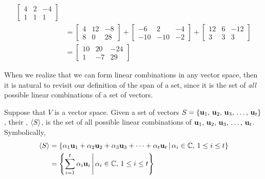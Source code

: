 \documentclass{ximera}
\begin{document}
\begin{example}
\begin{align*}
\begin{bmatrix}
                                                   4&2&-4\\
                                                   1&1&1
                                                 \end{bmatrix}\\
                                 &=
                                   \begin{bmatrix}
                                     4&12&-8\\
                                     8&0&28
                                   \end{bmatrix}
                                          +
                                          \begin{bmatrix}
                                            -6&2&-4\\
                                            -10&-10&-2
                                          \end{bmatrix}
                                                     +
                                                     \begin{bmatrix}
                                                       12&6&-12\\
                                                       3&3&3
                                                     \end{bmatrix}\\
                                 &=
                                   \begin{bmatrix}
                                     10&20&-24\\
                                     1&-7&29
                                   \end{bmatrix}
  \end{align*}
\end{example}

When we realize that we can form linear combinations in any vector
space, then it is natural to revisit our definition of the span of a
set, since it is the set of \textit{all} possible linear combinations
of a set of vectors.

\begin{definition}
  Suppose that $V$ is a vector space.
  Given a set of vectors $S=\{\mathbf{u}_{1},\,\mathbf{u}_{2},\,\mathbf{u}_{3},\,\ldots,\,\mathbf{u}_{t}\}$, their , $\left\langle S\right\rangle$, is the set of all possible linear combinations of $\mathbf{u}_{1},\,\mathbf{u}_{2},\,\mathbf{u}_{3},\,\ldots,\,\mathbf{u}_{t}$.  Symbolically,
  \begin{align*}
    \left\langle S\right\rangle&=\left\lbrace\alpha_{1}\mathbf{u}_{1}+\alpha_{2}\mathbf{u}_{2}+\alpha_{3}\mathbf{u}_{3}+\cdots +\alpha_{t}\mathbf{u}_{t}\,\middle|\,\alpha_i\in\mathbb{C},\,1\leq i\leq t\right\rbrace\\
           &=\left\lbrace\sum_{i=1}^{t}\alpha_i\mathbf{u}_i\,\middle|\,\alpha_i\in\mathbb{C},\,1\leq i\leq t\right\rbrace
  \end{align*}
\end{definition}
\end{document}
